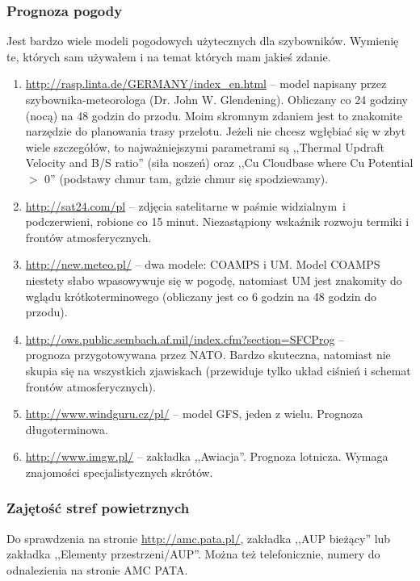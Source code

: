 \documentclass{article}
\begin{document}
\subsubsection{Prognoza pogody}
Jest bardzo wiele modeli pogodowych użytecznych dla szybowników. Wymienię
te, których sam używałem i na temat których mam jakieś zdanie.
\begin{enumerate}
\item \url{http://rasp.linta.de/GERMANY/index_en.html} -- model napisany
przez szybownika-meteorologa (Dr. John W. Glendening).
Obliczany co 24 godziny (nocą) na 48 godzin do przodu. Moim skromnym
zdaniem jest to znakomite narzędzie do planowania trasy przelotu.
Jeżeli nie chcesz wgłębiać się w zbyt wiele szczegółów, to najważniejszymi
parametrami są ,,Thermal Updraft Velocity and B/S ratio'' (siła noszeń) oraz
,,Cu Cloudbase where Cu Potential $>$ 0'' (podstawy chmur tam, gdzie chmur
się spodziewamy).

\item \url{http://sat24.com/pl} -- zdjęcia satelitarne w paśmie widzialnym~i
podczerwieni, robione co 15 minut. Niezastąpiony wskaźnik rozwoju termiki
i frontów atmosferycznych.

\item \url{http://new.meteo.pl/} -- dwa modele: COAMPS i UM. Model COAMPS
niestety słabo wpasowywuje się w pogodę, natomiast UM jest znakomity do
wglądu krótkoterminowego (obliczany jest co 6 godzin na 48 godzin do przodu).

\item \url{http://ows.public.sembach.af.mil/index.cfm?section=SFCProg} -- \\
prognoza przygotowywana przez NATO. Bardzo skuteczna, natomiast nie
skupia się na wszystkich zjawiskach (przewiduje tylko układ ciśnień i
schemat frontów atmosferycznych).

\item \url{http://www.windguru.cz/pl/} -- model GFS, jeden z wielu.
Prognoza długoterminowa.

\item \url{http://www.imgw.pl/} -- zakładka ,,Awiacja''. Prognoza lotnicza.
Wymaga znajomości specjalistycznych skrótów.

\end{enumerate}
\subsubsection{Zajętość stref powietrznych}
Do sprawdzenia na stronie \url{http://amc.pata.pl/}, zakładka
,,AUP bieżący'' lub zakładka ,,Elementy przestrzeni/AUP''. Można też
telefonicznie, numery do odnalezienia na stronie AMC PATA.
\end{document}
